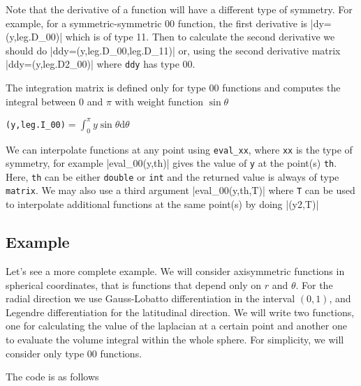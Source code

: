 Note that the derivative of a function will have a different type of symmetry. 
For example, for a symmetric-symmetric 00 function, the first derivative is
|dy=(y,leg.D_00)|
which is of type 11. Then to calculate the second derivative we should do
|ddy=(y,leg.D_00,leg.D_11)|
or, using the second derivative matrix
|ddy=(y,leg.D2_00)|
where \texttt{ddy} has type 00.

The integration matrix is defined only for type 00 functions and computes the integral between 0 and $\pi$
with weight function $\sin\theta$

\verb|(y,leg.I_00)|$\displaystyle=\int_0^{\pi}y\sin\theta\mathrm{d}\theta$

We can interpolate functions at any point using \texttt{eval\_xx}, where \texttt{xx} is the type
of symmetry, for example
|eval_00(y,th)|
gives the value of \texttt{y} at the point(s) \texttt{th}. Here, \texttt{th} can be either 
\texttt{double} or \texttt{int} and the returned value is always of type \texttt{matrix}.
We may also use a third argument
|eval_00(y,th,T)|
where \texttt{T} can be used to interpolate additional functions at the same point(s) by doing
|(y2,T)|

\subsection{Example}

Let's see a more complete example. We will consider axisymmetric functions in spherical coordinates, 
that is functions that depend only on $r$ and $\theta$. For the radial direction we use
Gauss-Lobatto differentiation in the interval $(0,1)$, and Legendre differentiation for the
latitudinal direction. We will write two functions, one for calculating the value of the laplacian
at a certain point and another one to evaluate the volume integral within the whole sphere.
For simplicity, we will consider only type 00 functions.

The code is as follows

